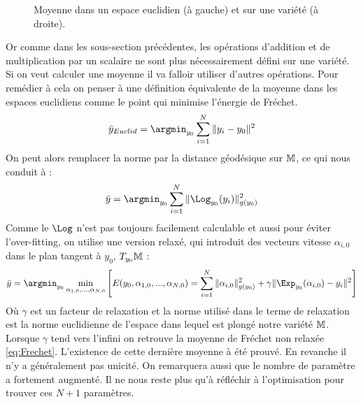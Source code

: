 \begin{figure}[b]
	\caption{Moyenne dans un espace euclidien (à gauche) et sur une variété (à droite).}
\end{figure}
Or comme dans les sous-section précédentes, les opérations d'addition et de multiplication par un scalaire ne sont plus nécessairement défini sur une variété. Si on veut calculer une moyenne il va falloir utiliser d'autres opérations. Pour remédier à cela on penser à une définition équivalente de la moyenne dans les espaces euclidiens comme le point qui minimise l'énergie de Fréchet.
\begin{equation}
	\bar{y}_{Euclid} = \argmin_{y_0} \sum_{i=1}^N \| y_i - y_0 \|^2
\end{equation}
On peut alors remplacer la norme par la distance géodésique sur $\mathbb{M}$, ce qui nous conduit à :
\begin{equation}
	\label{eq:Frechet}
	\bar{y} = \argmin_{y_0} \sum_{i=1}^N \| \Log_{y_0}(y_i) \|_{g(y_0)}^2
\end{equation}
Comme le $\Log$ n'est pas toujours facilement calculable et aussi pour éviter l'over-fitting, on utilise une version relaxé, qui introduit des vecteurs vitesse $\alpha_{i,0}$ dans le plan tangent à $y_0$, $T_{y_0} \mathbb{M}$ :
\begin{equation}
	\label{eq:Frechet_relax}
	\bar{y} = \argmin_{y_0} \min_{\alpha_{1,0}, ..., \alpha_{N,0}} \left[ E(y_0, \alpha_{1,0}, ..., \alpha_{N,0}) =  \sum_{i=1}^N \| \alpha_{i,0} \|_{g(y_0)}^2 + \gamma \| \Exp_{y_0}(\alpha_{i,0}) - y_i \|^2 \right]
\end{equation}
Où $\gamma$ est un facteur de relaxation et la norme utilisé dans le terme de relaxation est la norme euclidienne de l'espace dans lequel est plongé notre variété $\mathbb{M}$. Lorsque $\gamma$ tend vers l'infini on retrouve la moyenne de Fréchet non relaxée \eqref{eq:Frechet}. L'existence de cette dernière moyenne à été prouvé. En revanche il n'y a généralement pas unicité. On remarquera aussi que le nombre de paramètre a fortement augmenté. Il ne nous reste plus qu'à réfléchir à l'optimisation pour trouver ces $N+1$ paramètres.

